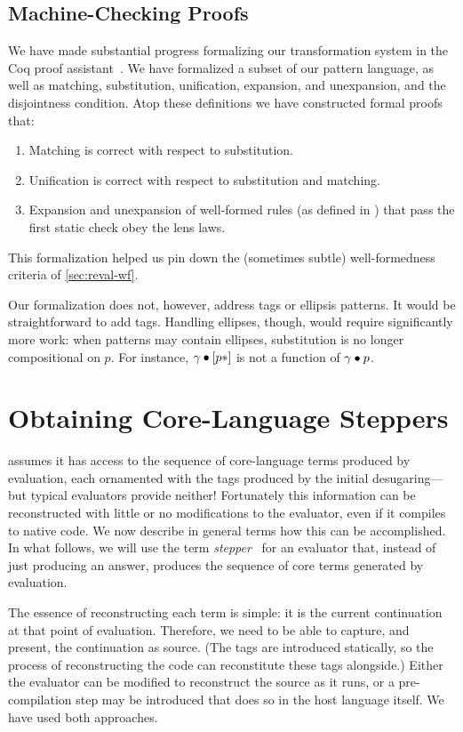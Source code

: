 \subsection{Machine-Checking Proofs}
\label{sec:reval-coq}

We have made substantial progress formalizing our transformation system in
the Coq proof assistant~\cite{coq-manual}. We have formalized a subset of
our pattern language, as well as matching, substitution, unification,
expansion, and unexpansion, and the disjointness condition. Atop these
definitions we have constructed formal proofs that:
\begin{enumerate}
\item Matching is correct with respect to substitution.
\item Unification is correct with respect to substitution and matching.
\item Expansion and unexpansion of well-formed rules (as defined in
  ) that pass the first static check obey the
  lens laws.
\end{enumerate}
This formalization helped us pin down the (sometimes subtle)
well-formedness criteria of \cref{sec:reval-wf}.

Our formalization does not, however, address tags or ellipsis patterns.
It would be straightforward to add tags. Handling ellipses, though, would
require significantly more work: when patterns may contain ellipses,
substitution is no longer compositional on $p$. For instance,
$\gamma \bullet [p*]$ is not a function of $\gamma \bullet p$.


\section{Obtaining Core-Language Steppers}
\label{sec:reval-lang}


{\Resugarer} assumes it has access to the sequence of core-language terms
produced by evaluation, each ornamented with the tags produced by the
initial desugaring---but typical evaluators provide neither!
Fortunately this information can be reconstructed with little or no
modifications to the evaluator, even if it compiles to native code. We now
describe in general terms how this can be accomplished.  In what follows,
we will use the term \emph{stepper}~\cite{racket-stepper} for an
evaluator that, instead of just producing an answer, produces
the sequence of core terms generated by evaluation.

The essence of reconstructing each term is simple: it is the current
continuation at that point of evaluation. Therefore, we need to be
able to capture, and present, the continuation as source. (The tags
are introduced statically, so the process of reconstructing the code
can reconstitute these tags alongside.) Either the evaluator can be
modified to reconstruct the source as it runs, or a pre-compilation step
may be introduced that does so in the host language itself. We have used
both approaches.

